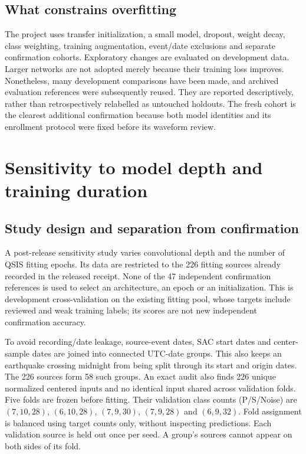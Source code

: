 \documentclass[a4paper,11pt,oneside]{article}
\begin{document}
\subsection{What constrains overfitting}
The project uses transfer initialization, a small model, dropout, weight
decay, class weighting, training augmentation, event/date exclusions and
separate confirmation cohorts. Exploratory changes are evaluated on
development data. Larger networks are not adopted merely because their
training loss improves. Nonetheless, many development comparisons have been
made, and archived evaluation references were subsequently reused. They are
reported descriptively, rather than retrospectively relabelled as untouched
holdouts. The fresh cohort is the clearest additional confirmation because
both model identities and its enrollment protocol were fixed before its
waveform review.
\FloatBarrier

\section{Sensitivity to model depth and training duration}\label{sec:sensitivity}
\subsection{Study design and separation from confirmation}
A post-release sensitivity study varies convolutional depth and the number
of QSIS fitting epochs. Its data are restricted to the 226 fitting sources
already recorded in the released receipt. None of the 47 independent
confirmation references is used to select an architecture, an epoch or an
initialization. This is development cross-validation on the existing fitting
pool, whose targets include reviewed and weak training labels; its scores
are not new independent confirmation accuracy.

To avoid recording/date leakage, source-event dates, SAC start dates and
center-sample dates are joined into connected UTC-date groups. This also
keeps an earthquake crossing midnight from being split through its start and
origin dates. The 226 sources form 58 such groups. An exact audit also finds
226 unique normalized centered inputs and no identical input shared across
validation folds. Five folds are frozen
before fitting. Their validation class counts (P/S/Noise) are $(7,10,28)$,
$(6,10,28)$, $(7,9,30)$, $(7,9,28)$ and $(6,9,32)$. Fold assignment is balanced
using target counts only, without inspecting predictions. Each validation
source is held out once per seed. A group's sources cannot appear on both
sides of its fold.
\end{document}

